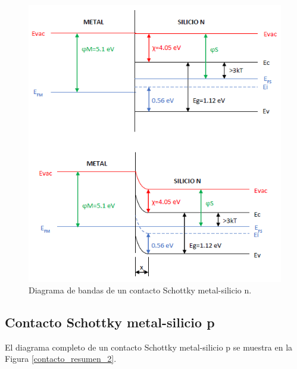 \begin{figure}[H]
    \centering
    \includegraphics{figuras/contacto_resumen_1.png}
    \caption{Diagrama de bandas de un contacto Schottky metal-silicio n.}
    \label{contacto_resumen_1}
\end{figure}

\newpage
\subsection{Contacto Schottky metal-silicio p}

El diagrama completo de un contacto Schottky metal-silicio p se muestra en la Figura \ref{contacto_resumen_2}.


